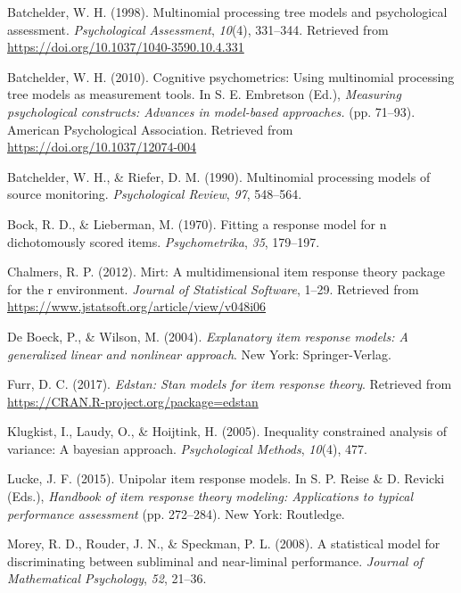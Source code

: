 \documentclass[english,,man]{apa6}
\begin{document}
\leavevmode\hypertarget{ref-Batchelder:1998}{}%
Batchelder, W. H. (1998). Multinomial processing tree models and psychological assessment. \emph{Psychological Assessment}, \emph{10}(4), 331--344. Retrieved from \url{https://doi.org/10.1037/1040-3590.10.4.331}

\leavevmode\hypertarget{ref-Batchelder:2010}{}%
Batchelder, W. H. (2010). Cognitive psychometrics: Using multinomial processing tree models as measurement tools. In S. E. Embretson (Ed.), \emph{Measuring psychological constructs: Advances in model-based approaches.} (pp. 71--93). American Psychological Association. Retrieved from \url{https://doi.org/10.1037/12074-004}

\leavevmode\hypertarget{ref-Batchelder:Riefer:1990}{}%
Batchelder, W. H., \& Riefer, D. M. (1990). Multinomial processing models of source monitoring. \emph{Psychological Review}, \emph{97}, 548--564.

\leavevmode\hypertarget{ref-Bock:Lieberman:1970}{}%
Bock, R. D., \& Lieberman, M. (1970). Fitting a response model for n dichotomously scored items. \emph{Psychometrika}, \emph{35}, 179--197.

\leavevmode\hypertarget{ref-Chalmers:2012}{}%
Chalmers, R. P. (2012). Mirt: A multidimensional item response theory package for the r environment. \emph{Journal of Statistical Software}, 1--29. Retrieved from \url{https://www.jstatsoft.org/article/view/v048i06}

\leavevmode\hypertarget{ref-DeBoeck:Wilson:2004}{}%
De Boeck, P., \& Wilson, M. (2004). \emph{Explanatory item response models: A generalized linear and nonlinear approach}. New York: Springer-Verlag.

\leavevmode\hypertarget{ref-Furr:2017}{}%
Furr, D. C. (2017). \emph{Edstan: Stan models for item response theory}. Retrieved from \url{https://CRAN.R-project.org/package=edstan}

\leavevmode\hypertarget{ref-Klugkist:etal:2005}{}%
Klugkist, I., Laudy, O., \& Hoijtink, H. (2005). Inequality constrained analysis of variance: A bayesian approach. \emph{Psychological Methods}, \emph{10}(4), 477.

\leavevmode\hypertarget{ref-Lucke:2015}{}%
Lucke, J. F. (2015). Unipolar item response models. In S. P. Reise \& D. Revicki (Eds.), \emph{Handbook of item response theory modeling: Applications to typical performance assessment} (pp. 272--284). New York: Routledge.

\leavevmode\hypertarget{ref-Morey:etal:2008a}{}%
Morey, R. D., Rouder, J. N., \& Speckman, P. L. (2008). A statistical model for discriminating between subliminal and near-liminal performance. \emph{Journal of Mathematical Psychology}, \emph{52}, 21--36.
\end{document}
